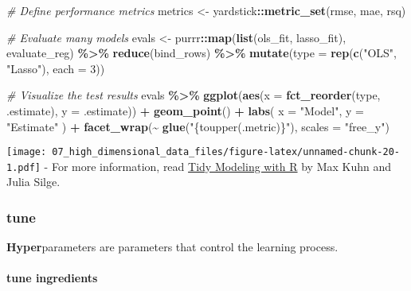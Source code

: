 \documentclass[
]{book}
\newenvironment{Shaded}{\begin{snugshade}}{\end{snugshade}}
\newcommand{\CommentTok}[1]{\textcolor[rgb]{0.56,0.35,0.01}{\textit{#1}}}
\newcommand{\DataTypeTok}[1]{\textcolor[rgb]{0.13,0.29,0.53}{#1}}
\newcommand{\DecValTok}[1]{\textcolor[rgb]{0.00,0.00,0.81}{#1}}
\newcommand{\KeywordTok}[1]{\textcolor[rgb]{0.13,0.29,0.53}{\textbf{#1}}}
\newcommand{\NormalTok}[1]{#1}
\newcommand{\OperatorTok}[1]{\textcolor[rgb]{0.81,0.36,0.00}{\textbf{#1}}}
\newcommand{\StringTok}[1]{\textcolor[rgb]{0.31,0.60,0.02}{#1}}
\begin{document}
\begin{Shaded}
\begin{Highlighting}[]
\CommentTok{\# Define performance metrics}
\NormalTok{metrics \textless{}{-}}\StringTok{ }\NormalTok{yardstick}\OperatorTok{::}\KeywordTok{metric\_set}\NormalTok{(rmse, mae, rsq)}

\CommentTok{\# Evaluate many models}
\NormalTok{evals \textless{}{-}}\StringTok{ }\NormalTok{purrr}\OperatorTok{::}\KeywordTok{map}\NormalTok{(}\KeywordTok{list}\NormalTok{(ols\_fit, lasso\_fit), evaluate\_reg) }\OperatorTok{\%\textgreater{}\%}
\StringTok{  }\KeywordTok{reduce}\NormalTok{(bind\_rows) }\OperatorTok{\%\textgreater{}\%}
\StringTok{  }\KeywordTok{mutate}\NormalTok{(}\DataTypeTok{type =} \KeywordTok{rep}\NormalTok{(}\KeywordTok{c}\NormalTok{(}\StringTok{"OLS"}\NormalTok{, }\StringTok{"Lasso"}\NormalTok{), }\DataTypeTok{each =} \DecValTok{3}\NormalTok{))}

\CommentTok{\# Visualize the test results}
\NormalTok{evals }\OperatorTok{\%\textgreater{}\%}
\StringTok{  }\KeywordTok{ggplot}\NormalTok{(}\KeywordTok{aes}\NormalTok{(}\DataTypeTok{x =} \KeywordTok{fct\_reorder}\NormalTok{(type, .estimate), }\DataTypeTok{y =}\NormalTok{ .estimate)) }\OperatorTok{+}
\StringTok{  }\KeywordTok{geom\_point}\NormalTok{() }\OperatorTok{+}
\StringTok{  }\KeywordTok{labs}\NormalTok{(}
    \DataTypeTok{x =} \StringTok{"Model"}\NormalTok{,}
    \DataTypeTok{y =} \StringTok{"Estimate"}
\NormalTok{  ) }\OperatorTok{+}
\StringTok{  }\KeywordTok{facet\_wrap}\NormalTok{(}\OperatorTok{\textasciitilde{}}\StringTok{ }\KeywordTok{glue}\NormalTok{(}\StringTok{"\{toupper(.metric)\}"}\NormalTok{), }\DataTypeTok{scales =} \StringTok{"free\_y"}\NormalTok{)}
\end{Highlighting}
\end{Shaded}

\texttt{[image: 07\_high\_dimensional\_data\_files/figure-latex/unnamed-chunk-20-1.pdf]}
- For more information, read \href{https://www.tmwr.org/}{Tidy Modeling with R} by Max Kuhn and Julia Silge.

\hypertarget{tune}{%
\subsubsection{tune}\label{tune}}

\textbf{Hyper}parameters are parameters that control the learning process.

\hypertarget{tune-ingredients}{%
\paragraph{tune ingredients}\label{tune-ingredients}}
\end{document}
